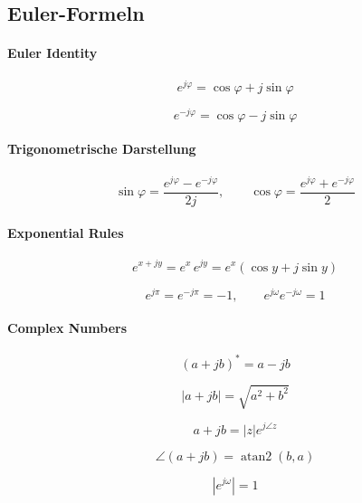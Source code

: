 \subsection{Euler-Formeln}

\paragraph{Euler Identity}

\[
\boxed{
e^{j\varphi}
=
\cos\varphi
+
j\sin\varphi
}
\]

\[
e^{-j\varphi}
=
\cos\varphi
-
j\sin\varphi
\]

\vspace{1mm}

\paragraph{Trigonometrische Darstellung}

\[
\sin\varphi
=
\frac{e^{j\varphi}-e^{-j\varphi}}{2j},
\qquad
\cos\varphi
=
\frac{e^{j\varphi}+e^{-j\varphi}}{2}
\]

\vspace{1mm}

\paragraph{Exponential Rules}

\[
e^{x+jy}
=
e^x\,e^{jy}
=
e^x(\cos y+j\sin y)
\]

\[
e^{j\pi}
=
e^{-j\pi}
=
-1,
\qquad
e^{j\omega}e^{-j\omega}=1
\]

\vspace{1mm}

\paragraph{Complex Numbers}

\[
(a+jb)^*=a-jb
\]

\[
|a+jb|
=
\sqrt{a^2+b^2}
\]

\[
a+jb
=
|z|e^{j\angle z}
\]

\[
\angle(a+jb)
=
\operatorname{atan2}(b,a)
\]

\[
|e^{j\omega}|=1
\]